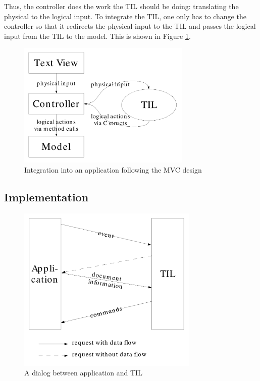 \documentclass[a4paper]{article}
\begin{document}
Thus, the controller does the work the TIL should be doing: translating the physical to the logical input. To integrate the TIL, one only has to change the controller so that it redirects the physical input to the TIL and passes the logical input from the TIL to the model. This is shown in Figure \ref{fg:integration}.

\begin{figure}[ht]
\centering

\includegraphics[height=6cm]{integration}

\caption{Integration into an application following the MVC design}
\label{fg:integration}
\end{figure}

\subsection{Implementation}

\begin{figure}[ht]
\centering

\includegraphics[height=8cm]{dialog}

\caption{A dialog between application and TIL}
\label{fg:dialog}
\end{figure}
\end{document}
